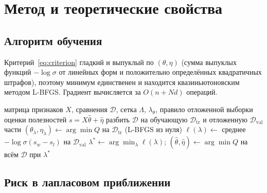 \documentclass{article}
\theoremstyle{definition}
\theoremstyle{remark}
\begin{document}
\section{Метод и теоретические свойства}
\label{sec:method}

\subsection{Алгоритм обучения}

Критерий~\eqref{eq:criterion} гладкий и выпуклый по $(\theta,\eta)$ (сумма выпуклых функций $-\log\sigma$ от линейных форм и положительно определённых квадратичных штрафов), поэтому минимум единственен и находится квазиньютоновским методом L-BFGS. Градиент вычисляется за $O(n+Nd)$ операций.

\begin{algorithm}[h]
\caption{Иерархическая модель Брэдли--Терри}\label{alg:fit}
\begin{algorithmic}[1]
\Require матрица признаков $X$, сравнения $\mathcal D$, сетка $\Lambda$, $\lambda_\theta$, правило отложенной выборки
\Ensure оценки полезностей $s=X\hat\theta+\hat\eta$
\State разбить $\mathcal D$ на обучающую $\mathcal D_{\mathrm{tr}}$ и отложенную $\mathcal D_{\mathrm{val}}$ части
\For{$\lambda\in\Lambda$}
	\State $(\theta_\lambda,\eta_\lambda)\gets\arg\min Q$ на $\mathcal D_{\mathrm{tr}}$ (L-BFGS из нуля)
	\State $\ell(\lambda)\gets$ среднее $-\log\sigma(s_w-s_l)$ на $\mathcal D_{\mathrm{val}}$
\EndFor
\State $\lambda^*\gets\arg\min_\lambda \ell(\lambda)$; $(\hat\theta,\hat\eta)\gets\arg\min Q$ на всём $\mathcal D$ при $\lambda^*$
\end{algorithmic}
\end{algorithm}

\subsection{Риск в лапласовом приближении}
\end{document}
